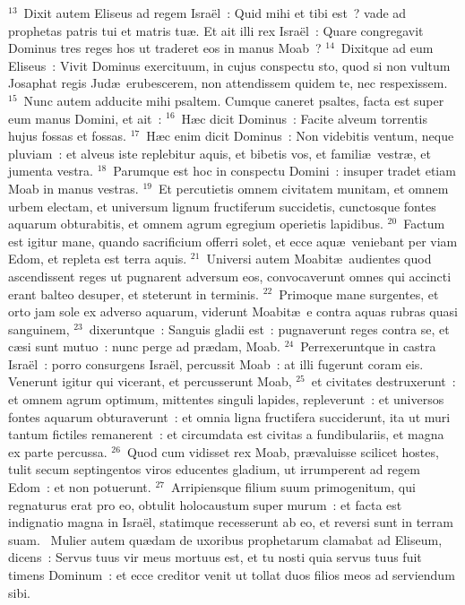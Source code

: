 ${}^{13}$~Dixit autem Eliseus ad regem Isra\"el~: Quid mihi et tibi est~? vade ad prophetas patris tui et matris tu\ae . Et ait illi rex Isra\"el~: Quare congregavit Dominus tres reges hos ut traderet eos in manus Moab~?
${}^{14}$~Dixitque ad eum Eliseus~: Vivit Dominus exercituum, in cujus conspectu sto, quod si non vultum Josaphat regis Jud\ae\ erubescerem, non attendissem quidem te, nec respexissem.
${}^{15}$~Nunc autem adducite mihi psaltem. Cumque caneret psaltes, facta est super eum manus Domini, et ait~:
${}^{16}$~H\ae c dicit Dominus~: Facite alveum torrentis hujus fossas et fossas.
${}^{17}$~H\ae c enim dicit Dominus~: Non videbitis ventum, neque pluviam~: et alveus iste replebitur aquis, et bibetis vos, et famili\ae\ vestr\ae , et jumenta vestra.
${}^{18}$~Parumque est hoc in conspectu Domini~: insuper tradet etiam Moab in manus vestras.
${}^{19}$~Et percutietis omnem civitatem munitam, et omnem urbem electam, et universum lignum fructiferum succidetis, cunctosque fontes aquarum obturabitis, et omnem agrum egregium operietis lapidibus.
${}^{20}$~Factum est igitur mane, quando sacrificium offerri solet, et ecce aqu\ae\ veniebant per viam Edom, et repleta est terra aquis.
${}^{21}$~Universi autem Moabit\ae\ audientes quod ascendissent reges ut pugnarent adversum eos, convocaverunt omnes qui accincti erant balteo desuper, et steterunt in terminis.
${}^{22}$~Primoque mane surgentes, et orto jam sole ex adverso aquarum, viderunt Moabit\ae\ e contra aquas rubras quasi sanguinem,
${}^{23}$~dixeruntque~: Sanguis gladii est~: pugnaverunt reges contra se, et c\ae si sunt mutuo~: nunc perge ad pr\ae dam, Moab.
${}^{24}$~Perrexeruntque in castra Isra\"el~: porro consurgens Isra\"el, percussit Moab~: at illi fugerunt coram eis. Venerunt igitur qui vicerant, et percusserunt Moab,
${}^{25}$~et civitates destruxerunt~: et omnem agrum optimum, mittentes singuli lapides, repleverunt~: et universos fontes aquarum obturaverunt~: et omnia ligna fructifera succiderunt, ita ut muri tantum fictiles remanerent~: et circumdata est civitas a fundibulariis, et magna ex parte percussa.
${}^{26}$~Quod cum vidisset rex Moab, pr\ae valuisse scilicet hostes, tulit secum septingentos viros educentes gladium, ut irrumperent ad regem Edom~: et non potuerunt.
${}^{27}$~Arripiensque filium suum primogenitum, qui regnaturus erat pro eo, obtulit holocaustum super murum~: et facta est indignatio magna in Isra\"el, statimque recesserunt ab eo, et reversi sunt in terram suam.
~\lettrine[lines=10,image=true,loversize=0.05,lraise=-0.03]{M}{}ulier autem qu\ae dam de uxoribus prophetarum clamabat ad Eliseum, dicens~: Servus tuus vir meus mortuus est, et tu nosti quia servus tuus fuit timens Dominum~: et ecce creditor venit ut tollat duos filios meos ad serviendum sibi.
